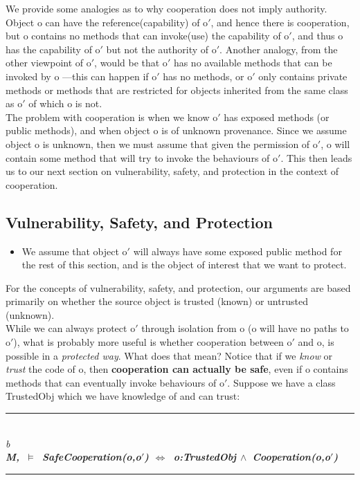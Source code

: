 \documentclass[a4paper,11pt,twoside]{article}
\makeatletter
\newenvironment{logic}
{\begin{minipage}[c]{\linewidth}  \sffamily \mdseries \begin{tabbing}}
{\end{tabbing}\end{minipage}\vspace{0.3em}}
\newcommand{\loand}{$\land$}
\newcommand{\losigma}{\text{$\upsigma$}}
\newcommand{\loturns} {$\vDash$}
\newcommand{\loiff} {$\iff$}
\newcommand{\hr}{\rule{\linewidth}{0.4pt}}
\DeclareRobustCommand{\emp}{%
  \@nomath\em \if b\expandafter\@car\f@series\@nil
  \normalfont \else \sffamily \bfseries \fi}
\makeatother
\begin{document}
We provide some analogies as to why cooperation does not imply authority. Object o can have the reference(capability) of o$'$, and hence there is cooperation, but o contains no methods that can invoke(use) the capability of o$'$, and thus o has the capability of o$'$ but not the authority of o$'$. Another analogy, from the other viewpoint of o$'$, would be that o$'$ has no available methods that can be invoked by o ---this can happen if o$'$ has no methods, or o$'$ only contains private methods or methods that are restricted for objects inherited from the same class as o$'$ of which o is not.\\

The problem with cooperation is when we know o$'$ has exposed methods (or public methods), and when object o is of unknown provenance. Since we assume object o is unknown, then we must assume that given the permission of o$'$, o will contain some method that will try to invoke the behaviours of o$'$. This then leads us to our next section on vulnerability, safety, and protection in the context of cooperation.

\subsection{Vulnerability, Safety, and Protection}\label{sec:vulnerability and protection}
\begin{itemize}\item We assume that object o$'$ will always have some exposed public method for the rest of this section, and is the object of interest that we want to protect.\end{itemize}
For the concepts of vulnerability, safety, and protection, our arguments are based primarily on whether the source object is trusted (known) or untrusted (unknown).\\

While we can always protect o$'$ through isolation from o (o will have no paths to o$'$), what is probably more useful is whether cooperation between o$'$ and o, is possible in a \textit{protected way}. What does that mean? Notice that if we \textit{know} or \textit{trust} the code of o, then \textbf{cooperation can actually be safe}, even if o contains methods that can eventually invoke behaviours of o$'$. Suppose we have a class TrustedObj which we have knowledge of and can trust:\\

\begin{logic}
\hr\\
\emp{Definition---[Safe cooperation]}\\
M,\losigma\ \loturns\ SafeCooperation(o,o$'$) \loiff\ o:TrustedObj \loand\ Cooperation(o,o$'$)\\
\hr
\end{logic}
\end{document}

